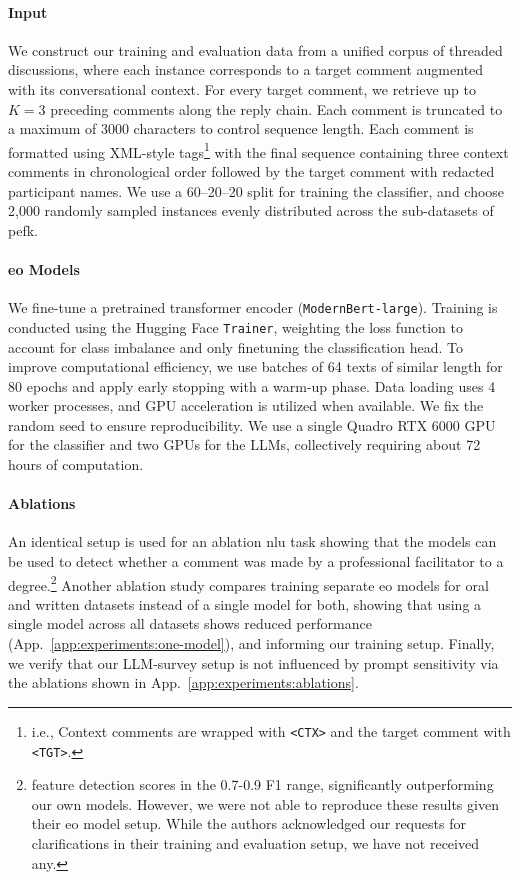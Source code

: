 \documentclass[11pt]{article}
\theoremstyle{definition}
\theoremstyle{plain}
\begin{document}
\paragraph{Input} We construct our training and evaluation data from a unified corpus of threaded discussions, where each instance corresponds to a target comment augmented with its conversational context. For every target comment, we retrieve up to $K=3$ preceding comments along the reply chain. Each comment is truncated to a maximum of 3000 characters to control sequence length. Each comment is formatted using XML-style tags\footnote{i.e., Context comments are wrapped with \texttt{<CTX>} and the target comment with \texttt{<TGT>}.} with the final sequence containing three context comments in chronological order followed by the target comment with redacted participant names. We use a 60–20–20 split for training the classifier, and choose 2,000 randomly sampled instances evenly distributed across the sub-datasets of \ac{pefk}.

\paragraph{\ac{eo} Models} We fine-tune a pretrained transformer encoder (\texttt{ModernBert-large}). Training is conducted using the Hugging Face \texttt{Trainer}, weighting the loss function to account for class imbalance and only finetuning the classification head. To improve computational efficiency, we use batches of 64 texts of similar length for 80 epochs and apply early stopping with a warm-up phase. Data loading uses 4 worker processes, and GPU acceleration is utilized when available. We fix the random seed to ensure reproducibility. We use a single Quadro RTX 6000 GPU for the classifier and two GPUs for the LLMs, collectively requiring about 72 hours of computation. 

\paragraph{Ablations} An identical setup is used for an ablation \ac{nlu} task showing that the models can be used to detect whether a comment was made by a professional facilitator to a degree.\footnote{\citet{schroeder-etal-2024-fora} feature detection scores in the 0.7-0.9 F1 range, significantly outperforming our own models. However, we were not able to reproduce these results given their \ac{eo} model setup. While the authors acknowledged our requests for clarifications in their training and evaluation setup, we have not received any.} Another ablation study compares training separate \ac{eo} models for oral and written datasets instead of a single model for both, showing that using a single model across all datasets shows reduced performance (App.~\ref{app:experiments:one-model}), and informing our training setup. Finally, we verify that our LLM-survey setup is not influenced by prompt sensitivity via the ablations shown in App.~\ref{app:experiments:ablations}.
\end{document}
